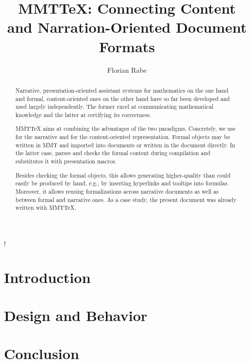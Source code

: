 \documentclass[orivec]{llncs}
\title{MMTTeX: Connecting Content and Narration-Oriented Document Formats}
\author{Florian Rabe}
\institute{Universities Paris-Sud and Erlangen-Nuremberg}
\newcommand{\mmttex}{MMTTeX\xspace}
\begin{document}
\maketitle
\begin{abstract}
Narrative, presentation-oriented assistant systems for mathematics on the one hand and formal, content-oriented ones on the other hand have so far been developed and used largely independently.
The former excel at communicating mathematical knowledge and the latter at certifying its correctness.

\mmttex aims at combining the advantages of the two paradigms.
Concretely, we use \latex for the narrative and {\mmt} for the content-oriented representation.
Formal objects may be written in MMT and imported into \latex documents or written in the \latex document directly.
In the latter case, \mmt parses and checks the formal content during \latex compilation and substitutes it with \latex presentation macros.

Besides checking the formal objects, this allows generating higher-quality \latex than could easily be produced by hand, e.g., by inserting hyperlinks and tooltips into formulas.
Moreover, it allows reusing formalizations across narrative documents as well as between formal and narrative ones.
As a case study, the present document was already written with \mmttex.
\end{abstract}


\lstMakeShortInline[basicstyle=]!

\section{Introduction}\label{sec:intro}
  

\section{Design and Behavior} \label{sec:pdflatex}
  
  
\section{Conclusion}\label{sec:conc}
  



\end{document}
